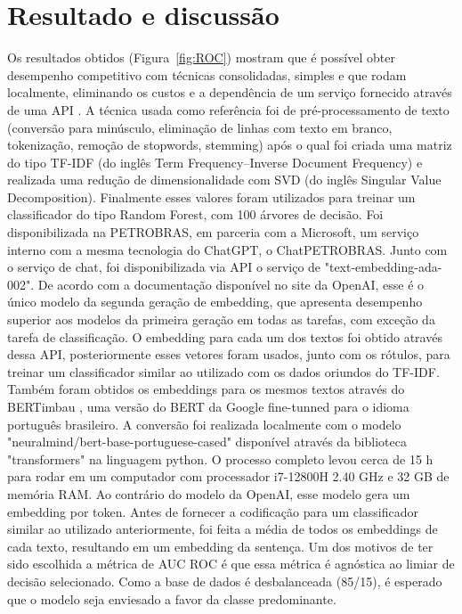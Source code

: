 \documentclass[conference]{IEEEtran}
\begin{document}
\section{Resultado e discussão}


  Os resultados obtidos (Figura~\ref{fig:ROC}) mostram que é possível obter desempenho competitivo com técnicas consolidadas, simples e que rodam localmente, eliminando os custos e a dependência de um serviço fornecido através de uma API \cite{neelakantan2022text}.
  A técnica usada como referência foi de pré-processamento de texto (conversão para minúsculo, eliminação de linhas com texto em branco, tokenização, remoção de stopwords, stemming) após o qual foi criada uma matriz do tipo TF-IDF (do inglês Term Frequency–Inverse Document Frequency) e realizada uma redução de dimensionalidade com SVD (do inglês Singular Value Decomposition). Finalmente esses valores foram utilizados para treinar um classificador do tipo Random Forest, com 100 árvores de decisão.
  Foi disponibilizada na PETROBRAS, em parceria com a Microsoft, um serviço interno com a mesma tecnologia do ChatGPT, o ChatPETROBRAS. Junto com o serviço de chat, foi disponibilizada via API o serviço de "text-embedding-ada-002". De acordo com a documentação disponível no site da OpenAI, esse é o único modelo da segunda geração de embedding, que apresenta desempenho superior aos modelos da primeira geração \cite{neelakantan2022text} em todas as tarefas, com exceção da tarefa de classificação. O embedding para cada um dos textos foi obtido através dessa API, posteriormente esses vetores foram usados, junto com os rótulos, para treinar um classificador similar ao utilizado com os dados oriundos do TF-IDF.
  Também foram obtidos os embeddings para os mesmos textos através do BERTimbau \cite{souza2020bertimbau}, uma versão do BERT da Google fine-tunned para o idioma português brasileiro. A conversão foi realizada localmente com o modelo "neuralmind/bert-base-portuguese-cased" disponível através da biblioteca "transformers" na linguagem python. O processo completo levou cerca de 15 h para rodar em um computador com processador i7-12800H 2.40 GHz e 32 GB de memória RAM. Ao contrário do modelo da OpenAI, esse modelo gera um embedding por token. Antes de fornecer a codificação para um classificador similar ao utilizado anteriormente, foi feita a média de todos os embeddings de cada texto, resultando em um embedding da sentença.
  Um dos motivos de ter sido escolhida a métrica de AUC ROC é que essa métrica é agnóstica ao limiar de decisão selecionado. Como a base de dados é desbalanceada (85/15), é esperado que o modelo seja enviesado a favor da classe predominante.
  
\end{document}
